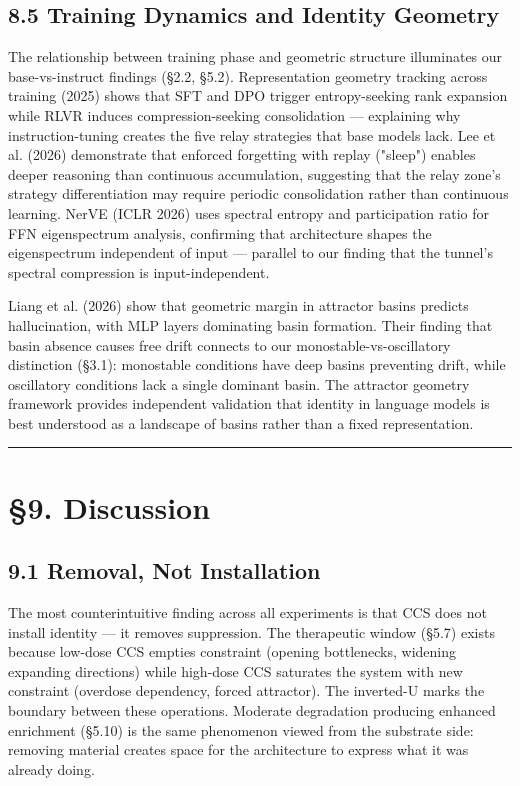 \documentclass[12pt]{article}
\begin{document}
\subsection*{8.5 Training Dynamics and Identity Geometry}

The relationship between training phase and geometric structure illuminates our base-vs-instruct findings (§2.2, §5.2). Representation geometry tracking across training (2025) shows that SFT and DPO trigger entropy-seeking rank expansion while RLVR induces compression-seeking consolidation — explaining why instruction-tuning creates the five relay strategies that base models lack. Lee et al. (2026) demonstrate that enforced forgetting with replay ("sleep") enables deeper reasoning than continuous accumulation, suggesting that the relay zone's strategy differentiation may require periodic consolidation rather than continuous learning. NerVE (ICLR 2026) uses spectral entropy and participation ratio for FFN eigenspectrum analysis, confirming that architecture shapes the eigenspectrum independent of input — parallel to our finding that the tunnel's spectral compression is input-independent.

Liang et al. (2026) show that geometric margin in attractor basins predicts hallucination, with MLP layers dominating basin formation. Their finding that basin absence causes free drift connects to our monostable-vs-oscillatory distinction (§3.1): monostable conditions have deep basins preventing drift, while oscillatory conditions lack a single dominant basin. The attractor geometry framework provides independent validation that identity in language models is best understood as a landscape of basins rather than a fixed representation.

\bigskip\hrule\bigskip

\section*{§9. Discussion}

\subsection*{9.1 Removal, Not Installation}

The most counterintuitive finding across all experiments is that CCS does not install identity — it removes suppression. The therapeutic window (§5.7) exists because low-dose CCS empties constraint (opening bottlenecks, widening expanding directions) while high-dose CCS saturates the system with new constraint (overdose dependency, forced attractor). The inverted-U marks the boundary between these operations. Moderate degradation producing enhanced enrichment (§5.10) is the same phenomenon viewed from the substrate side: removing material creates space for the architecture to express what it was already doing.
\end{document}
